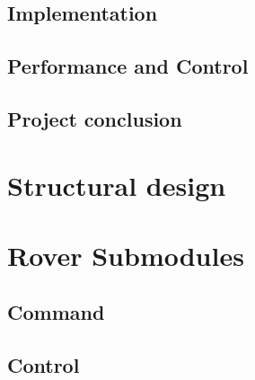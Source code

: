 \documentclass[11pt, a4paper]{article}
\begin{document}
\vfill


\pagebreak
\subsection{Implementation}




\subsection{Performance and Control}




\subsection{Project conclusion}



\vfill






\pagebreak

\section{Structural design}







\pagebreak



\pagebreak
\section{Rover Submodules}

\subsection{Command}



\subsection{Control}
\end{document}
